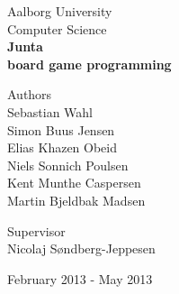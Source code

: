 \begin{titlingpage}
\begin{center}

\vspace*{1.0cm}

\LARGE Aalborg University\\[0.75cm]
\Large Computer Science\\[1.75cm]

\vspace{1.0cm}
{ \fontsize{80.2pt}{80.2pt} \bfseries {} Junta \\}
\vspace{0.15cm}
{ \fontsize{35.2pt}{35.2pt} \bfseries {} board game programming}
\vspace{2.5cm}

\begin{minipage}{13.37cm}
  \begin{flushleft} \large
    \vspace{0pt}
    {\small Authors } \\
    \vspace{0.5cm}
    Sebastian Wahl\\
    Simon Buus Jensen\\
    Elias Khazen Obeid\\
    Niels Sonnich Poulsen\\
    Kent Munthe Caspersen\\
    Martin Bjeldbak Madsen\\
  \end{flushleft}

  \begin{flushright} \large
    \vspace{-120pt}
    {\small Supervisor}\\
    \vspace{0.5cm}
    Nicolaj Søndberg-Jeppesen
  \end{flushright}
\end{minipage}

\vfill

{\large February 2013 - May 2013}
\end{center}
\end{titlingpage}
